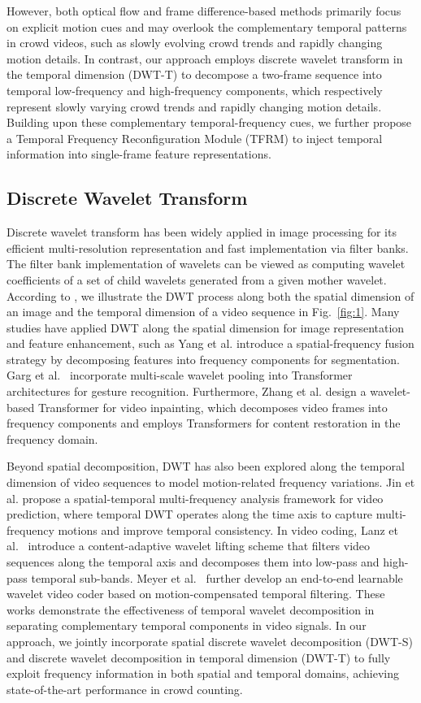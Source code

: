 \documentclass[lettersize,journal]{IEEEtran}
\begin{document}
However, both optical flow and frame difference-based methods primarily focus on explicit motion cues and may overlook the complementary temporal patterns in crowd videos, such as slowly evolving crowd trends and rapidly changing motion details. In contrast, our approach employs discrete wavelet transform in the temporal dimension (DWT-T) to decompose a two-frame sequence into temporal low-frequency and high-frequency components, which respectively represent slowly varying crowd trends and rapidly changing motion details. Building upon these complementary temporal-frequency cues, we further propose a Temporal Frequency Reconfiguration Module (TFRM) to inject temporal information into single-frame feature representations.

\subsection{Discrete Wavelet Transform}
Discrete wavelet transform has been widely applied in image processing for its efficient multi-resolution representation and fast implementation via filter banks. The filter bank implementation of wavelets can be viewed as computing wavelet coefficients of a set of child wavelets generated from a given mother wavelet. According to \cite{mallat1989theory}, we illustrate the DWT process along both the spatial dimension of an image and the temporal dimension of a video sequence in Fig.~\ref{fig:1}. Many studies have applied DWT along the spatial dimension for image representation and feature enhancement, such as Yang et al.\cite{yang2024sffnet} introduce a spatial-frequency fusion strategy by decomposing features into frequency components for segmentation. Garg et al.~\cite{garg2024gestformer}  incorporate multi-scale wavelet pooling into Transformer architectures for gesture recognition. Furthermore, Zhang et al.\cite{zhang2024wtvi} design a wavelet-based Transformer for video inpainting, which decomposes video frames into frequency components and employs Transformers for content restoration in the frequency domain.

Beyond spatial decomposition, DWT has also been explored along the temporal dimension of video sequences to model motion-related frequency variations. Jin et al.\cite{jin2020exploring} propose a spatial-temporal multi-frequency analysis framework for video prediction, where temporal DWT operates along the time axis to capture multi-frequency motions and improve temporal consistency. In video coding, Lanz et al.~\cite{lanz2019content} introduce a content-adaptive wavelet lifting scheme that filters video sequences along the temporal axis and decomposes them into low-pass and high-pass temporal sub-bands. Meyer et al.~\cite{meyer2023learned} further develop an end-to-end learnable wavelet video coder based on motion-compensated temporal filtering. These works demonstrate the effectiveness of temporal wavelet decomposition in separating complementary temporal components in video signals. In our approach, we jointly incorporate spatial discrete wavelet decomposition (DWT-S) and discrete wavelet decomposition in temporal dimension (DWT-T) to fully exploit frequency information in both spatial and temporal domains, achieving state-of-the-art performance in crowd counting.
\end{document}
